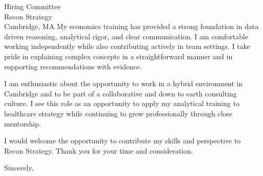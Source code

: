 \documentclass[11pt]{letter}
\begin{document}
\begin{letter}{Hiring Committee \\ Recon Strategy \\ Cambridge, MA}
My economics training has provided a strong foundation in data driven reasoning, analytical rigor, and clear communication. I am comfortable working independently while also contributing actively in team settings. I take pride in explaining complex concepts in a straightforward manner and in supporting recommendations with evidence.

I am enthusiastic about the opportunity to work in a hybrid environment in Cambridge and to be part of a collaborative and down to earth consulting culture. I see this role as an opportunity to apply my analytical training to healthcare strategy while continuing to grow professionally through close mentorship.

I would welcome the opportunity to contribute my skills and perspective to Recon Strategy. Thank you for your time and consideration.

\closing{Sincerely,}

\end{letter}
\end{document}

